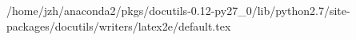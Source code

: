 /home/jzh/anaconda2/pkgs/docutils-0.12-py27_0/lib/python2.7/site-packages/docutils/writers/latex2e/default.tex